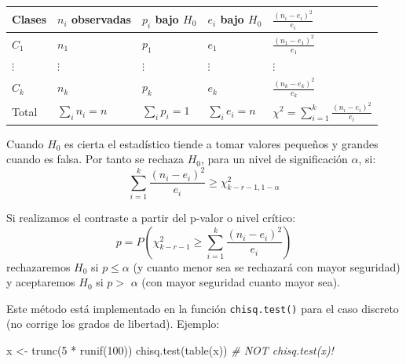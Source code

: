 \documentclass[
]{book}
\newenvironment{Shaded}{\begin{snugshade}}{\end{snugshade}}
\newcommand{\CommentTok}[1]{\textcolor[rgb]{0.56,0.35,0.01}{\textit{#1}}}
\newcommand{\DecValTok}[1]{\textcolor[rgb]{0.00,0.00,0.81}{#1}}
\newcommand{\FunctionTok}[1]{\textcolor[rgb]{0.00,0.00,0.00}{#1}}
\newcommand{\NormalTok}[1]{#1}
\newcommand{\OtherTok}[1]{\textcolor[rgb]{0.56,0.35,0.01}{#1}}
\newcommand{\SpecialCharTok}[1]{\textcolor[rgb]{0.00,0.00,0.00}{#1}}
\theoremstyle{break}
\theoremstyle{definition}
\theoremstyle{definition}
\theoremstyle{definition}
\theoremstyle{definition}
\theoremstyle{remark}
\begin{document}
\begin{longtable}[]{@{}
  >{\raggedright\arraybackslash}p{}
  >{\raggedright\arraybackslash}p{}
  >{\raggedright\arraybackslash}p{}
  >{\raggedright\arraybackslash}p{}
  >{\raggedright\arraybackslash}p{}@{}}
\toprule
Clases & \(n_{i}\) observadas & \(p_{i}\) bajo \(H_0\) & \(e_{i}\) bajo \(H_0\) & \(\frac{(n_{i}-e_{i})^2}{e_{i}}\) \\
\midrule
\endhead
\(C_1\) & \(n_1\) & \(p_1\) & \(e_1\) & \(\frac{(n_1-e_1)^2}{e_1}\) \\
\(\vdots\) & \(\vdots\) & \(\vdots\) & \(\vdots\) & \(\vdots\) \\
\(C_{k}\) & \(n_{k}\) & \(p_{k}\) & \(e_{k}\) & \(\frac{(n_{k}-e_{k})^2}{e_{k}}\) \\
Total & \(\sum_{i}n_{i}=n\) & \(\sum_{i}p_{i}=1\) & \(\sum_{i}e_{i}=n\) & \(\chi^2=\sum_{i=1}^{k}\frac{(n_{i}-e_{i})^2}{e_{i}}\) \\
\bottomrule
\end{longtable}

Cuando \(H_0\) es cierta el estadístico tiende a tomar valores pequeños y grandes cuando es falsa.
Por tanto se rechaza \(H_0\), para un nivel de significación \(\alpha\), si:
\[\sum_{i=1}^{k}\frac{(n_{i}-e_{i})^2}{e_{i}}\geq \chi_{k-r-1,1-\alpha}^2\]

Si realizamos el contraste a partir del p-valor o nivel crítico:
\[p=P\left(  {\chi_{k-r-1}^2\geq \sum \limits_{i=1}^{k}{\frac{(n_{i}-e_{i})^2}{e_{i}}}}\right)\]
rechazaremos \(H_0\) si \(p\leq \alpha\) (y cuanto menor sea se rechazará con mayor seguridad) y aceptaremos \(H_0\) si \(p>\) \(\alpha\) (con mayor seguridad cuanto mayor sea).

Este método está implementado en la función \texttt{chisq.test()} para el caso discreto (no corrige los grados de libertad).
Ejemplo:

\begin{Shaded}
\begin{Highlighting}[]
\NormalTok{x }\OtherTok{\textless{}{-}} \FunctionTok{trunc}\NormalTok{(}\DecValTok{5} \SpecialCharTok{*} \FunctionTok{runif}\NormalTok{(}\DecValTok{100}\NormalTok{))}
\FunctionTok{chisq.test}\NormalTok{(}\FunctionTok{table}\NormalTok{(x))            }\CommentTok{\# NOT \textquotesingle{}chisq.test(x)\textquotesingle{}!}
\end{Highlighting}
\end{Shaded}
\end{document}
